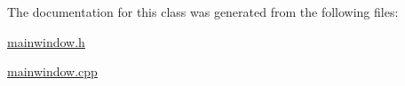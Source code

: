 The documentation for this class was generated from the following files\-:\begin{DoxyCompactItemize}
\item 
\hyperlink{mainwindow_8h}{mainwindow.\-h}\item 
\hyperlink{mainwindow_8cpp}{mainwindow.\-cpp}\end{DoxyCompactItemize}
